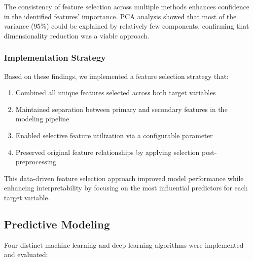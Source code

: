 \documentclass[12pt,a4paper]{article}
\begin{document}
The consistency of feature selection across multiple methods enhances confidence in the identified features' importance. PCA analysis showed that most of the variance (95\%) could be explained by relatively few components, confirming that dimensionality reduction was a viable approach.

\subsubsection{Implementation Strategy}

Based on these findings, we implemented a feature selection strategy that:

\begin{enumerate}
    \item Combined all unique features selected across both target variables
    \item Maintained separation between primary and secondary features in the modeling pipeline
    \item Enabled selective feature utilization via a configurable parameter
    \item Preserved original feature relationships by applying selection post-preprocessing
\end{enumerate}

This data-driven feature selection approach improved model performance while enhancing interpretability by focusing on the most influential predictors for each target variable.

\subsection{Predictive Modeling}

Four distinct machine learning and deep learning algorithms were implemented and evaluated:
\end{document}
